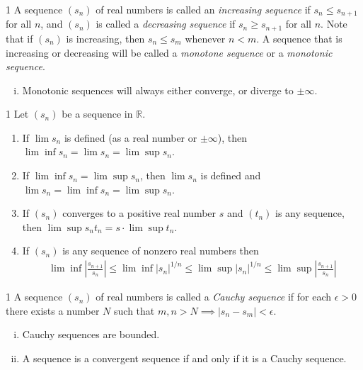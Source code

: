 \begin{defn}{1}
	A sequence $(s_n)$ of real numbers is called an \textit{increasing sequence}	if $s_n \leq s_{n+1}$ for all $n$, and $(s_n)$ is called a \textit{decreasing sequence} if
	$s_n \geq s_{n+1}$ for all $n$. Note that if $(s_n)$ is increasing, then $s_n \leq s_m$
	whenever $n < m$. A sequence that is increasing or decreasing will	be called a \textit{monotone sequence} or a \textit{monotonic sequence}.
	\begin{enumerate}[(i)]
		\item Monotonic sequences will always either converge, or diverge to $\pm \infty$.
	\end{enumerate}
\end{defn}

\newpage

\begin{theo}{1}
	Let $(s_n)$ be a sequence in $\mathbb{R}$.
	\begin{enumerate}[(i	)]
		\item If $\lim s_n$ is defined (as a real number or $\pm\infty$), then $\lim \inf s_n = \lim s_n = \lim \sup s_n$.
		\item If $\lim \inf s_n = \lim \sup s_n$, then $\lim s_n$ is defined and $\lim s_n =
		\lim \inf s_n = \lim \sup s_n$.
		\item If $(s_n)$ converges to a positive real number $s$ and $(t_n)$ is any sequence, then $\lim \sup s_n t_n = s\cdot \lim \sup t_n$.
		\item If $(s_n)$ is any sequence of nonzero real numbers then
		\begin{align}
			\lim \inf \left|\frac{s_{n+1}}{s_n}\right| \leq \lim \inf |s_n|^{1/n} \leq \lim \sup |s_n|^{1/n} \leq \lim \sup \left|\frac{s_{n+1}}{s_n}\right| \nonumber
		\end{align}
	\end{enumerate}
\end{theo}

\begin{defn}{1}
	A sequence $(s_n)$ of real numbers is called a \textit{Cauchy sequence} if for each $\epsilon > 0$ there exists a number $N$ such that $m,n > N \implies |s_n-s_m|<\epsilon$.
	\begin{enumerate}[(i)]
		\item Cauchy sequences are bounded.
		\item A sequence is a convergent sequence if and only if it is a Cauchy sequence. 
	\end{enumerate}	
\end{defn}

